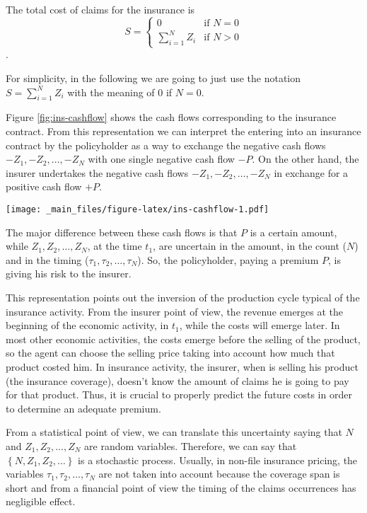 \documentclass[a4paper, twoside, openright, 12pt]{report}
\let\origfigure\figure
\let\endorigfigure\endfigure
\renewenvironment{figure}[1][2] {
  \expandafter\origfigure\expandafter[!hbtp]
} {
  \endorigfigure
}
\theoremstyle{definition}
\theoremstyle{definition}
\theoremstyle{definition}
\theoremstyle{remark}
\begin{document}
The total cost of claims for the insurance is
\[
S = 
\begin{cases}
  0                    & \text{if } N=0 \\
  \sum_{i=1}^{N}{Z_i}  & \text{if } N>0
\end{cases}
\].

For simplicity, in the following we are going to just use the notation \(S = \sum_{i=1}^{N}{Z_i}\) with the meaning of \(0\) if \(N=0\).

Figure \ref{fig:ins-cashflow} shows the cash flows corresponding to the insurance contract. From this representation we can interpret the entering into an insurance contract by the policyholder as a way to exchange the negative cash flows \(-Z_1, -Z_2, \dots, -Z_N\) with one single negative cash flow \(-P\). On the other hand, the insurer undertakes the negative cash flows \(-Z_1, -Z_2, \dots, -Z_N\) in exchange for a positive cash flow \(+P\).

\begin{figure}
\centering
\texttt{[image: \_main\_files/figure-latex/ins-cashflow-1.pdf]}
\caption{\label{fig:ins-cashflow}Insurance Contract cash flows.}
\end{figure}

The major difference between these cash flows is that \(P\) is a certain amount, while \(Z_1, Z_2, \dots, Z_N\), at the time \(t_1\), are uncertain in the amount, in the count (\(N\)) and in the timing (\(\tau_1, \tau_2, \dots, \tau_N\)). So, the policyholder, paying a premium \(P\), is giving his risk to the insurer.

This representation points out the inversion of the production cycle typical of the insurance activity. From the insurer point of view, the revenue emerges at the beginning of the economic activity, in \(t_1\), while the costs will emerge later. In most other economic activities, the costs emerge before the selling of the product, so the agent can choose the selling price taking into account how much that product costed him. In insurance activity, the insurer, when is selling his product (the insurance coverage), doesn't know the amount of claims he is going to pay for that product. Thus, it is crucial to properly predict the future costs in order to determine an adequate premium.

From a statistical point of view, we can translate this uncertainty saying that \(N\) and \(Z_1, Z_2, \dots, Z_N\) are random variables. Therefore, we can say that \(\left\{N, Z_1, Z_2, \dots \right\}\) is a stochastic process. Usually, in non-file insurance pricing, the variables \(\tau_1, \tau_2, \dots, \tau_N\) are not taken into account because the coverage span is short and from a financial point of view the timing of the claims occurrences has negligible effect.
\end{document}
